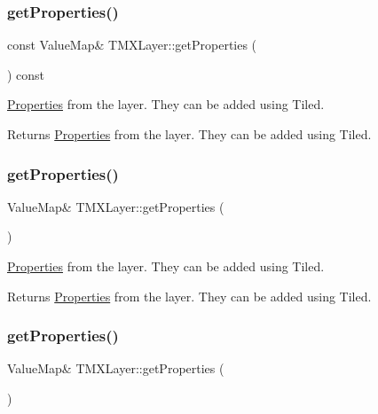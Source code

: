 \subsubsection{\texorpdfstring{get\+Properties()}{getProperties()}\hspace{0.1cm}{\footnotesize\ttfamily [2/4]}}
{\footnotesize\ttfamily const Value\+Map\& T\+M\+X\+Layer\+::get\+Properties (\begin{DoxyParamCaption}{ }\end{DoxyParamCaption}) const\hspace{0.3cm}{\ttfamily [inline]}}

\hyperlink{classProperties}{Properties} from the layer. They can be added using Tiled.

\begin{DoxyReturn}{Returns}
\hyperlink{classProperties}{Properties} from the layer. They can be added using Tiled. 
\end{DoxyReturn}
\mbox{\label{classTMXLayer_a48fdd277ced00a92a6d1ebd26a02fb11}} 
\subsubsection{\texorpdfstring{get\+Properties()}{getProperties()}\hspace{0.1cm}{\footnotesize\ttfamily [3/4]}}
{\footnotesize\ttfamily Value\+Map\& T\+M\+X\+Layer\+::get\+Properties (\begin{DoxyParamCaption}{ }\end{DoxyParamCaption})\hspace{0.3cm}{\ttfamily [inline]}}

\hyperlink{classProperties}{Properties} from the layer. They can be added using Tiled.

\begin{DoxyReturn}{Returns}
\hyperlink{classProperties}{Properties} from the layer. They can be added using Tiled. 
\end{DoxyReturn}
\mbox{\label{classTMXLayer_a48fdd277ced00a92a6d1ebd26a02fb11}} 
\subsubsection{\texorpdfstring{get\+Properties()}{getProperties()}\hspace{0.1cm}{\footnotesize\ttfamily [4/4]}}
{\footnotesize\ttfamily Value\+Map\& T\+M\+X\+Layer\+::get\+Properties (\begin{DoxyParamCaption}{ }\end{DoxyParamCaption})\hspace{0.3cm}{\ttfamily [inline]}}

